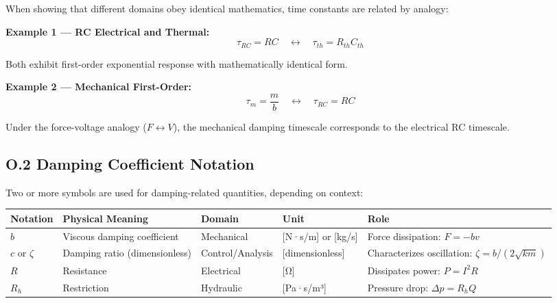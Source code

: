 \documentclass[
]{article}
\begin{document}
When showing that different domains obey identical mathematics, time
constants are related by analogy:

\textbf{Example 1 --- RC Electrical and Thermal:}
\[\tau_{RC} = RC \quad \leftrightarrow \quad \tau_{th} = R_{th} C_{th}\]

Both exhibit first-order exponential response with mathematically
identical form.

\textbf{Example 2 --- Mechanical First-Order:}
\[\tau_m = \frac{m}{b} \quad \leftrightarrow \quad \tau_{RC} = RC\]

Under the force-voltage analogy (\(F \leftrightarrow V\)), the
mechanical damping timescale corresponds to the electrical RC timescale.

\subsection{O.2 Damping Coefficient
Notation}\label{o.2-damping-coefficient-notation}

Two or more symbols are used for damping-related quantities, depending
on context:

\begin{longtable}[]{@{}
  >{\raggedright\arraybackslash}p{}
  >{\raggedright\arraybackslash}p{}
  >{\raggedright\arraybackslash}p{}
  >{\raggedright\arraybackslash}p{}
  >{\raggedright\arraybackslash}p{}@{}}
\toprule\noalign{}
\begin{minipage}[b]{\linewidth}\raggedright
Notation
\end{minipage} & \begin{minipage}[b]{\linewidth}\raggedright
Physical Meaning
\end{minipage} & \begin{minipage}[b]{\linewidth}\raggedright
Domain
\end{minipage} & \begin{minipage}[b]{\linewidth}\raggedright
Unit
\end{minipage} & \begin{minipage}[b]{\linewidth}\raggedright
Role
\end{minipage} \\
\midrule\noalign{}
\endhead
\bottomrule\noalign{}
\endlastfoot
\(b\) & Viscous damping coefficient & Mechanical & {[}N·s/m{]} or
{[}kg/s{]} & Force dissipation: \(F = -bv\) \\
\(c\) or \(\zeta\) & Damping ratio (dimensionless) & Control/Analysis &
{[}dimensionless{]} & Characterizes oscillation:
\(\zeta = b/(2\sqrt{km})\) \\
\(R\) & Resistance & Electrical & {[}Ω{]} & Dissipates power:
\(P = I^2 R\) \\
\(R_h\) & Restriction & Hydraulic & {[}Pa·s/m³{]} & Pressure drop:
\(\Delta p = R_h Q\) \\
\end{longtable}
\end{document}
